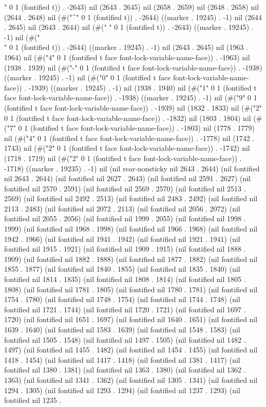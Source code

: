 " 0 1 (fontified t)) . -2643) nil (2643 . 2645) nil (2658 . 2659) nil (2648 . 2658) nil (2644 . 2648) nil (#("^" 0 1 (fontified t)) . -2644) ((marker . 19245) . -1) nil (2644 . 2645) nil (2643 . 2644) nil (#(" " 0 1 (fontified t)) . -2643) ((marker . 19245) . -1) nil (#("\\" 0 1 (fontified t)) . -2644) ((marker . 19245) . -1) nil (2643 . 2645) nil (1963 . 1964) nil (#("4" 0 1 (fontified t face font-lock-variable-name-face)) . -1963) nil (1938 . 1939) nil (#("-" 0 1 (fontified t face font-lock-variable-name-face)) . -1938) ((marker . 19245) . -1) nil (#("0" 0 1 (fontified t face font-lock-variable-name-face)) . -1939) ((marker . 19245) . -1) nil (1938 . 1940) nil (#("1" 0 1 (fontified t face font-lock-variable-name-face)) . -1938) ((marker . 19245) . -1) nil (#("9" 0 1 (fontified t face font-lock-variable-name-face)) . -1939) nil (1832 . 1833) nil (#("2" 0 1 (fontified t face font-lock-variable-name-face)) . -1832) nil (1803 . 1804) nil (#("7" 0 1 (fontified t face font-lock-variable-name-face)) . -1803) nil (1778 . 1779) nil (#("4" 0 1 (fontified t face font-lock-variable-name-face)) . -1778) nil (1742 . 1743) nil (#("2" 0 1 (fontified t face font-lock-variable-name-face)) . -1742) nil (1718 . 1719) nil (#("2" 0 1 (fontified t face font-lock-variable-name-face)) . -1718) ((marker . 19235) . -1) nil (nil rear-nonsticky nil 2643 . 2644) (nil fontified nil 2643 . 2644) (nil fontified nil 2627 . 2643) (nil fontified nil 2591 . 2627) (nil fontified nil 2570 . 2591) (nil fontified nil 2569 . 2570) (nil fontified nil 2513 . 2569) (nil fontified nil 2492 . 2513) (nil fontified nil 2483 . 2492) (nil fontified nil 2113 . 2483) (nil fontified nil 2072 . 2113) (nil fontified nil 2056 . 2072) (nil fontified nil 2055 . 2056) (nil fontified nil 1999 . 2055) (nil fontified nil 1998 . 1999) (nil fontified nil 1968 . 1998) (nil fontified nil 1966 . 1968) (nil fontified nil 1942 . 1966) (nil fontified nil 1941 . 1942) (nil fontified nil 1921 . 1941) (nil fontified nil 1915 . 1921) (nil fontified nil 1909 . 1915) (nil fontified nil 1888 . 1909) (nil fontified nil 1882 . 1888) (nil fontified nil 1877 . 1882) (nil fontified nil 1855 . 1877) (nil fontified nil 1840 . 1855) (nil fontified nil 1835 . 1840) (nil fontified nil 1814 . 1835) (nil fontified nil 1808 . 1814) (nil fontified nil 1805 . 1808) (nil fontified nil 1781 . 1805) (nil fontified nil 1780 . 1781) (nil fontified nil 1754 . 1780) (nil fontified nil 1748 . 1754) (nil fontified nil 1744 . 1748) (nil fontified nil 1721 . 1744) (nil fontified nil 1720 . 1721) (nil fontified nil 1697 . 1720) (nil fontified nil 1651 . 1697) (nil fontified nil 1640 . 1651) (nil fontified nil 1639 . 1640) (nil fontified nil 1583 . 1639) (nil fontified nil 1548 . 1583) (nil fontified nil 1505 . 1548) (nil fontified nil 1497 . 1505) (nil fontified nil 1482 . 1497) (nil fontified nil 1455 . 1482) (nil fontified nil 1454 . 1455) (nil fontified nil 1418 . 1454) (nil fontified nil 1417 . 1418) (nil fontified nil 1381 . 1417) (nil fontified nil 1380 . 1381) (nil fontified nil 1363 . 1380) (nil fontified nil 1362 . 1363) (nil fontified nil 1341 . 1362) (nil fontified nil 1305 . 1341) (nil fontified nil 1294 . 1305) (nil fontified nil 1293 . 1294) (nil fontified nil 1237 . 1293) (nil fontified nil 1235 . 